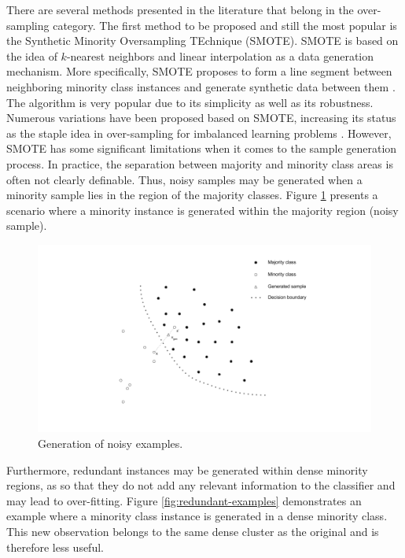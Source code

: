 \documentclass[parskip=full]{scrartcl}
\begin{document}
There are several methods presented in the literature that belong in the
over-sampling category. The first method to be  proposed and still the most
popular is the Synthetic Minority Oversampling TEchnique (SMOTE). SMOTE is based
on the idea of \( k \)-nearest neighbors and linear interpolation as a data
generation mechanism. More specifically, SMOTE proposes to form a line segment
between neighboring minority class instances and generate synthetic data between
them \cite{Chawla.2002}. The algorithm is very popular due to its simplicity as
well as its robustness. Numerous variations have been proposed based on SMOTE,
increasing its status as the staple idea in over-sampling for imbalanced
learning problems \cite{Fernandez.2018}. However, SMOTE has some significant
limitations when it comes to the sample generation process. In practice, the
separation between majority and minority class areas is often not clearly
definable. Thus, noisy samples may be generated when a minority sample lies in
the region of the majority classes. Figure \ref{fig:noisy-examples} presents a
scenario where a minority instance is generated within the majority region
(noisy sample).

\begin{figure}[H]
	\centering
	\includegraphics[width=1.0\linewidth]{../analysis/noisy_examples.png}
	\caption{Generation of noisy examples.}
	\label{fig:noisy-examples}
\end{figure}

Furthermore, redundant instances may be generated within dense minority regions,
as so that they do not add any relevant information to the classifier and may
lead to over-fitting. Figure \ref{fig:redundant-examples} demonstrates an
example where a minority  class instance is generated in a dense minority class.
This new observation belongs to the same dense cluster as the original and is
therefore less useful. 
\end{document}
